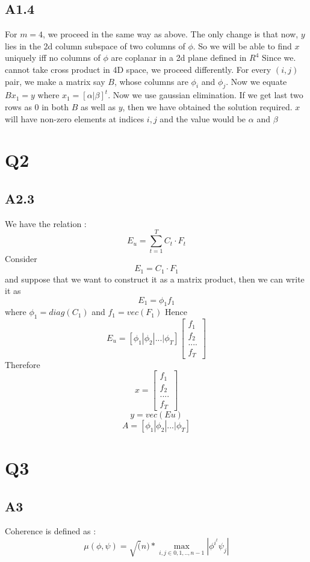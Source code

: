 \documentclass{article}
\begin{document}
\subsection*{A1.4}
For $m=4$, we proceed in the same way as above. The only change is that now, $y$ lies in the 2d column subspace of
two columns of $\phi$. So we will be able to find $x$ uniquely iff no columns of $\phi$ are coplanar in a 2d plane
defined in $R^4$
Since we. cannot take cross product in 4D space, we proceed differently. For every $(i,j)$ pair, we make a matrix say $B$,
whose columns are $\phi_i$ and $\phi_j$. Now we equate $Bx_1 = y$ where $x_1 = [\alpha | \beta]^t$. Now we use gaussian elimination.
If we get last two rows as 0 in both $B$ as well as $y$, then we have obtained the solution required. $x$ will have non-zero elements
at indices $i,j$ and the value would be $\alpha$ and $\beta$

\section*{Q2}
\subsection*{A2.3}
We have the relation : $$E_u = \sum_{t=1}^TC_t \cdot F_t$$
Consider $$E_1 = C_1 \cdot F_1$$ and suppose that we want to construct it as a matrix product, then we can write it as
$$E_1 = \phi_1 f_1$$ where $\phi_1 = diag(C_1)$ and $f_1 = vec(F_1)$
Hence $$E_u = [\phi_1 | \phi_2 |...| \phi_T] \begin{bmatrix}
  f_1\\ f_2 \\....\\ f_T \end{bmatrix} $$
Therefore $$x = \begin{bmatrix}
  f_1\\ f_2 \\....\\ f_T \end{bmatrix}$$
$$ y = vec(Eu)$$
$$A = [\phi_1 | \phi_2 |...| \phi_T]$$




\section*{Q3}
\subsection*{A3}
Coherence is defined as : $$\mu(\phi,\psi) = \sqrt(n)*\max_{i,j \in {0,1,..,n-1}} |\phi^{i^{t}}\psi_j|$$
\end{document}
